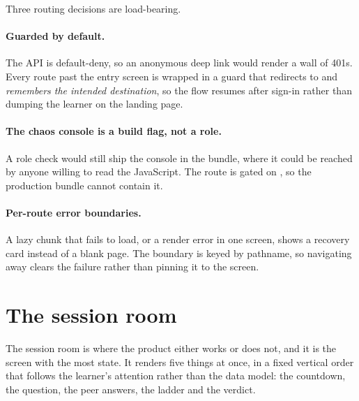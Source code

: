 Three routing decisions are load-bearing.

\paragraph{Guarded by default.} The API is default-deny, so an anonymous deep link would
render a wall of 401s. Every route past the entry screen is wrapped in a guard that
redirects to  and \emph{remembers the intended destination}, so the flow
resumes after sign-in rather than dumping the learner on the landing page.

\paragraph{The chaos console is a build flag, not a role.} A role check would still ship
the console in the bundle, where it could be reached by anyone willing to read the
JavaScript. The route is gated on , so the production bundle
cannot contain it.

\paragraph{Per-route error boundaries.} A lazy chunk that fails to load, or a render error
in one screen, shows a recovery card instead of a blank page. The boundary is keyed by
pathname, so navigating away clears the failure rather than pinning it to the screen.

\section{The session room}

The session room is where the product either works or does not, and it is the screen with
the most state. It renders five things at once, in a fixed vertical order that follows the
learner's attention rather than the data model: the countdown, the question, the peer
answers, the ladder and the verdict.

